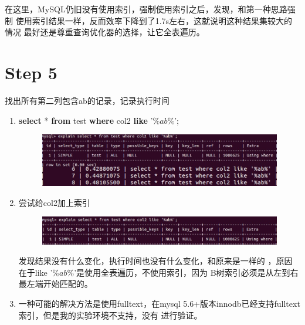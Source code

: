 \documentclass[UTF8]{ctexart}
\begin{document}
\begin{enumerate}
        在这里，MySQL仍旧没有使用索引，强制使用索引之后，发现，和第一种思路强制
        使用索引结果一样，反而效率下降到了1.7s左右，这就说明这种结果集较大的情况
        最好还是尊重查询优化器的选择，让它全表遍历。
        
    \end{enumerate}

\section{Step 5}
找出所有第二列包含ab的记录，记录执行时间
    \begin{enumerate}
        \item \textbf{select }* \textbf{from }test \textbf{where }col2 \textbf{like } '$\% ab\% $';
        \begin{figure}[ht]
            \centering
            \includegraphics[scale=0.55]{db11.jpg}
            \label{fig:db11}
        \end{figure} 
        \item 尝试给col2加上索引
        \begin{figure}[ht]
            \centering
            \includegraphics[scale=0.55]{db12.jpg}
            \label{fig:db12}
        \end{figure} 
        
        发现结果没有什么变化，执行时间也没有什么变化，和原来是一样的
        ，原因在于like '$\% ab\% $'是使用全表遍历，不使用索引，因为
        B树索引必须是从左到右最左端开始匹配的。
        
        \item 
        一种可能的解决方法是使用fulltext，在mysql 5.6+版本innodb已经支持fulltext索引，但是我的实验环境不支持，没有
        进行验证。
    \end{enumerate}
\end{document}
